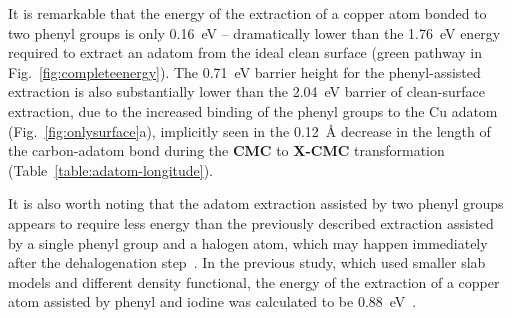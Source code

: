 \documentclass[journal=jacsat,manuscript=article]{achemso}
\newcommand{\lock}{\color{red}}
\newcommand{\zhzh}{\color{blue}}
\newcommand{\lock}{\color{black}}
\newcommand{\zhzh}{\color{blue}}
\newcommand{\comm}{\color{ForestGreen}} %
\begin{document}
{\lock

It is remarkable that the energy of the extraction of a copper atom bonded to two phenyl groups is only \SI{0.16}{\electronvolt} -- dramatically lower than the \SI{1.76}{\electronvolt} energy required to extract an adatom from the ideal clean surface (green pathway in Fig.~\ref{fig:completeenergy}). The \SI{0.71}{\electronvolt} barrier height for the phenyl-assisted extraction is also substantially lower than the \SI{2.04}{\electronvolt} barrier of clean-surface extraction, due to the increased binding of the phenyl groups to the Cu adatom (Fig.~\ref{fig:onlysurface}a), implicitly seen in the \SI{0.12}{\angstrom} decrease in the length of the carbon-adatom bond during the \textbf{CMC} to \textbf{X-CMC} transformation (Table~\ref{table:adatom-longitude}).

It is also worth noting that the adatom extraction assisted by two phenyl groups appears to require less energy than the previously described extraction assisted by a single phenyl group and a halogen atom, which may happen immediately after the dehalogenation step~\cite{chemeurope2017}. 
In the previous study, which used smaller slab models and different density functional, the energy of the extraction of a copper atom assisted by phenyl and iodine was calculated to be \SI{0.88}{\electronvolt}~\cite{chemeurope2017}. %

}
\end{document}
